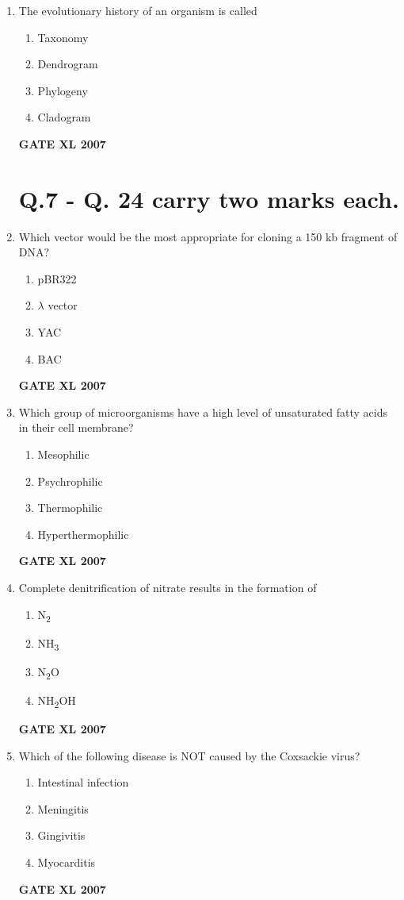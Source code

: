\documentclass[journal,12pt,onecolumn]{IEEEtran}
\begin{document}
\begin{enumerate}
\item The evolutionary history of an organism is called
\begin{enumerate}
    \item Taxonomy
    \item Dendrogram
    \item Phylogeny
    \item Cladogram
\end{enumerate}\hfill{\textbf{GATE XL 2007}}

\vspace{2em}

\section*{Q.7 - Q. 24 carry two marks each.}

\item Which vector would be the most appropriate for cloning a 150 kb fragment of DNA?
\begin{enumerate}
    \item pBR322
    \item $\lambda$ vector
    \item YAC
    \item BAC
\end{enumerate}\hfill{\textbf{GATE XL 2007}}

\item Which group of microorganisms have a high level of unsaturated fatty acids in their cell membrane?
\begin{enumerate}
    \item Mesophilic
    \item Psychrophilic
    \item Thermophilic
    \item Hyperthermophilic
\end{enumerate}\hfill{\textbf{GATE XL 2007}}

\item Complete denitrification of nitrate results in the formation of
\begin{enumerate}
    \item N\textsubscript{2}
    \item NH\textsubscript{3}
    \item N\textsubscript{2}O
    \item NH\textsubscript{2}OH
\end{enumerate}\hfill{\textbf{GATE XL 2007}}

\item Which of the following disease is NOT caused by the Coxsackie virus?
\begin{enumerate}
    \item Intestinal infection
    \item Meningitis
    \item Gingivitis
    \item Myocarditis
\end{enumerate}\hfill{\textbf{GATE XL 2007}}


\end{enumerate}
\end{document}
